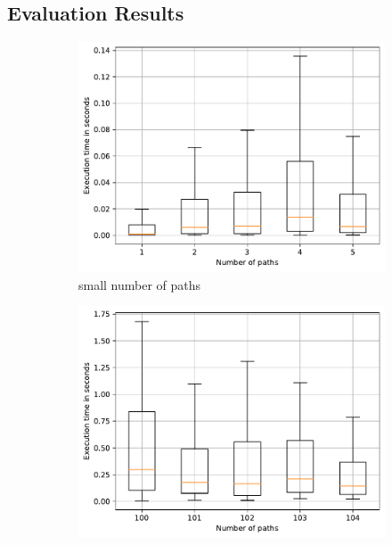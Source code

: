 \subsection{Evaluation Results}
\begin{figure}
	\begin{subfigure}{0.32\textwidth}
		\includegraphics[width=\linewidth,trim=0 0 -1.5cm 0]{pictures/tensor_go_10_small.pdf}
		\caption{small number of paths} \label{fig:extractTimeGoSmallTns}
	\end{subfigure}
	\hspace*{\fill} %
	\begin{subfigure}{0.32\textwidth}
		\includegraphics[width=\linewidth,trim=0 0 -1.5cm 0]{pictures/tensor_go_10_big.pdf}

\end{subfigure}
\end{figure}
